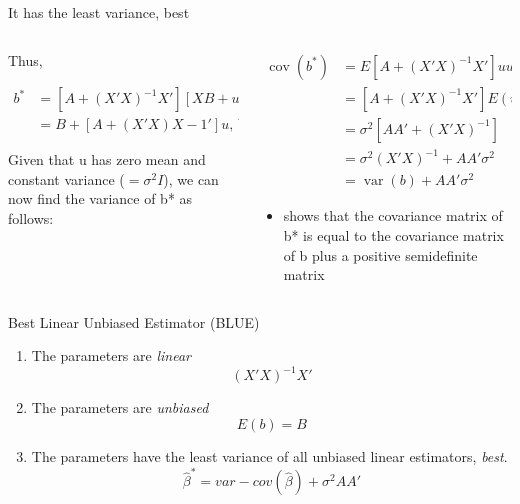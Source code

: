 \documentclass[australian,ignorenonframetext,aspectratio=169]{beamer}
\providecommand{\tightlist}{%
  \setlength{\itemsep}{0pt}\setlength{\parskip}{0pt}}
\begin{document}
\begin{frame}{It has the least variance, best}
\protect\hypertarget{it-has-the-least-variance-best}{}

\begin{columns}[T]
\begin{column}{0.5\textwidth}
\small

Thus,

\[
\begin{aligned}
b^*&=\left[A+(X'X)^{-1} X \prime\right][X B+u], \text{substituting for } (y) \\
&=B+[A+(X'X) X-1 \prime] u \text{, because } A X=0
\end{aligned}
\]

Given that u has zero mean and constant variance (\(=\sigma^2I\)), we
can now find the variance of b* as follows:
\end{column}

\begin{column}{0.5\textwidth}
\small

\[
\begin{aligned}
\operatorname{cov}\left(b^*\right)&=E\left[A+(X \prime X)^{-1} X \prime\right] u u \prime\left[A+(X \prime X)^{-1} X^{\prime}\right] \prime \\
&=\left[A+(X \prime X)^{-1} X \prime\right] E(u u \prime)\left[A+(X \prime X)^{-1} X \prime\right] \prime \\
&=\sigma^2\left[A A \prime+(X \prime X)^{-1}\right] \\
&=\sigma^2(X \prime X)^{-1}+A A \prime \sigma^2 \\
&=\operatorname{var}(b)+A A \prime \sigma^2
\end{aligned}
\]

\begin{itemize}
\tightlist
\item
  shows that the covariance matrix of b* is equal to the covariance
  matrix of b plus a positive semidefinite matrix
\end{itemize}
\end{column}
\end{columns}

\end{frame}

\begin{frame}{Best Linear Unbiased Estimator (BLUE)}
\protect\hypertarget{best-linear-unbiased-estimator-blue-1}{}

\begin{enumerate}
\tightlist
\item
  The parameters are \emph{linear} \[(X'X)^{-1}X'\]
\item
  The parameters are \emph{unbiased} \[E(b) = B\]
\item
  The parameters have the least variance of all unbiased linear
  estimators, \emph{best}.
  \[\widehat{\beta}^{*} = var - cov(\widehat{\beta}) + \sigma^2AA'\]
\end{enumerate}

\end{frame}
\end{document}
